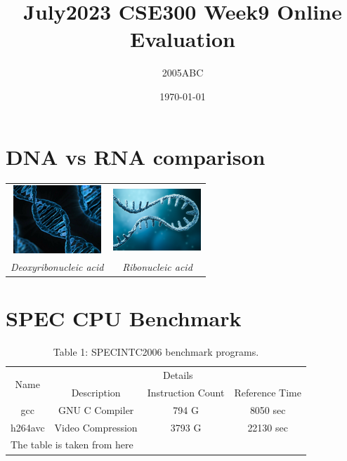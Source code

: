 \documentclass[11pt]{article}
\title{July2023 CSE300 Week9 Online Evaluation}
\author{2005ABC}
\date{\today}
\begin{document}
    \maketitle
    
    \section*{DNA vs RNA comparison}
    
    \begin{table}[h]
    	\centering
    	\begin{tabular}{c c}
    		\includegraphics{DNA.png} & \includegraphics{RNA.png} \\
    		\textit{Deoxyribonucleic acid} & \textit{Ribonucleic acid}\\
    	\end{tabular}
    \end{table}
    
    \section*{SPEC CPU Benchmark}
    \begin{table}[h]
    	\centering
    	\caption{Table 1: SPECINTC2006 benchmark programs.}
    	\begin{tabular}{|c | c | c | c |}
    		\hline
    		\multirow{2}{*}{Name} & \multicolumn{3}{c|}{Details}\\
    		\cline{2-4}
    		& Description & Instruction Count & Reference Time \\
    		\hline
    		gcc & GNU C Compiler & 794 G & 8050 sec \\
    		\hline
    		h264avc & Video Compression & 3793 G & 22130 sec\\
    		\hline
    		\multicolumn{4}{l}{The table is taken from here \cite{cpu}}\\
    	\end{tabular}
    \end{table}
    
\end{document}
